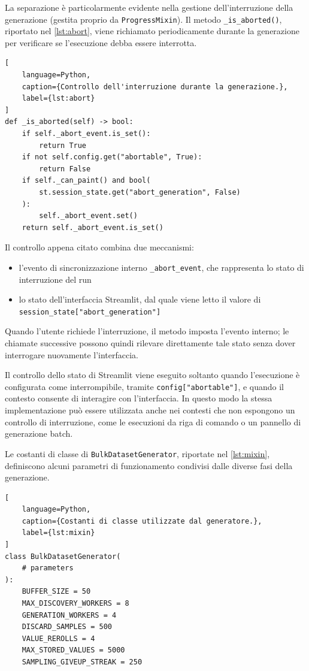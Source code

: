 \documentclass[12pt,a4paper,openright,twoside]{book}
\begin{document}
La separazione è particolarmente evidente nella gestione dell'interruzione della
generazione (gestita proprio da \texttt{ProgressMixin}). Il metodo
\texttt{\_is\_aborted()}, riportato nel \cref{lst:abort}, viene richiamato
periodicamente durante la generazione per verificare se l'esecuzione debba
essere interrotta.

\begin{lstlisting}[
    language=Python,
    caption={Controllo dell'interruzione durante la generazione.},
    label={lst:abort}
]
def _is_aborted(self) -> bool:
    if self._abort_event.is_set():
        return True
    if not self.config.get("abortable", True):
        return False
    if self._can_paint() and bool(
        st.session_state.get("abort_generation", False)
    ):
        self._abort_event.set()
    return self._abort_event.is_set()
\end{lstlisting}

Il controllo appena citato combina due meccanismi:
\begin{itemize}
    \item l'evento di sincronizzazione interno \texttt{\_abort\_event}, che
          rappresenta lo stato di interruzione del run
    \item  lo stato dell'interfaccia Streamlit, dal quale viene letto il valore
          di \texttt{session\_state["abort\_generation"]}
\end{itemize}
Quando l'utente richiede l'interruzione, il metodo imposta l'evento interno; le
chiamate successive possono quindi rilevare direttamente tale stato senza dover
interrogare nuovamente l'interfaccia.

Il controllo dello stato di Streamlit viene eseguito soltanto quando
l'esecuzione è configurata come interrompibile, tramite
\texttt{config["abortable"]}, e quando il contesto consente di interagire con
l'interfaccia. In questo modo la stessa implementazione può essere utilizzata
anche nei contesti che non espongono un controllo di interruzione, come le
esecuzioni da riga di comando o un pannello di generazione batch.

Le costanti di classe di \texttt{BulkDatasetGenerator}, riportate nel
\cref{lst:mixin}, definiscono alcuni parametri di funzionamento condivisi dalle
diverse fasi della generazione.

\begin{lstlisting}[
    language=Python,
    caption={Costanti di classe utilizzate dal generatore.},
    label={lst:mixin}
]
class BulkDatasetGenerator(
    # parameters
):
    BUFFER_SIZE = 50
    MAX_DISCOVERY_WORKERS = 8
    GENERATION_WORKERS = 4
    DISCARD_SAMPLES = 500
    VALUE_REROLLS = 4
    MAX_STORED_VALUES = 5000
    SAMPLING_GIVEUP_STREAK = 250
\end{lstlisting}
\end{document}
